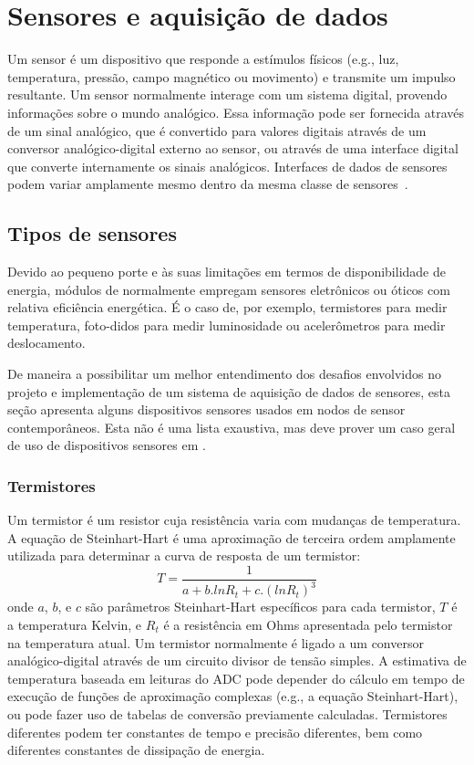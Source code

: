 \section{Sensores e aquisição de dados}
\label{sec:sensores}

Um sensor é um dispositivo que responde a estímulos físicos (e.g., luz,
temperatura, pressão, campo magnético ou movimento) e transmite um impulso
resultante. Um sensor normalmente interage com um sistema digital, provendo
informações sobre o mundo analógico. Essa informação pode ser fornecida através
de um sinal analógico, que é convertido para valores digitais através de um
conversor analógico-digital externo ao sensor, ou através de uma interface
digital que converte internamente os sinais analógicos. Interfaces de dados de
sensores podem variar amplamente mesmo dentro da mesma classe de
sensores~\cite{Wanner:MSC:2006}.

\subsection{Tipos de sensores}

Devido ao pequeno porte e às suas limitações em termos de disponibilidade de
energia, módulos de \rssf normalmente empregam sensores eletrônicos ou óticos
com relativa eficiência energética. É o caso de, por exemplo, termistores para
medir temperatura, foto-didos para medir luminosidade ou acelerômetros
para medir deslocamento.

De maneira a possibilitar um melhor entendimento dos desafios envolvidos no
projeto e implementação de um sistema de aquisição de dados de sensores, esta
seção apresenta alguns dispositivos sensores usados em nodos de sensor
contemporâneos. Esta não é uma lista exaustiva, mas deve prover um caso geral de
uso de dispositivos sensores em \rssf.

\subsubsection{Termistores}

Um termistor é um resistor cuja resistência varia com mudanças de temperatura. A
equação de Steinhart-Hart é uma aproximação de terceira ordem amplamente
utilizada para determinar a curva de resposta de um termistor:
\begin{equation}
\label{eq:steinhart_hart}
T = \frac{1}{a + b.ln{R_t} + c.(ln{R_t})^3}
\end{equation}
onde $a$, $b$, e $c$ são parâmetros Steinhart-Hart específicos para cada
termistor, $T$ é a temperatura Kelvin, e $R_t$ é a resistência em Ohms
apresentada pelo termistor na temperatura atual. Um termistor normalmente é
ligado a um conversor analógico-digital através de um circuito divisor de tensão
simples. A estimativa de temperatura baseada em leituras do ADC pode depender do
cálculo em tempo de execução de funções de aproximação complexas (e.g., a
equação Steinhart-Hart), ou pode fazer uso de tabelas de conversão previamente
calculadas. Termistores diferentes podem ter constantes de tempo e precisão
diferentes, bem como diferentes constantes de dissipação de energia.

